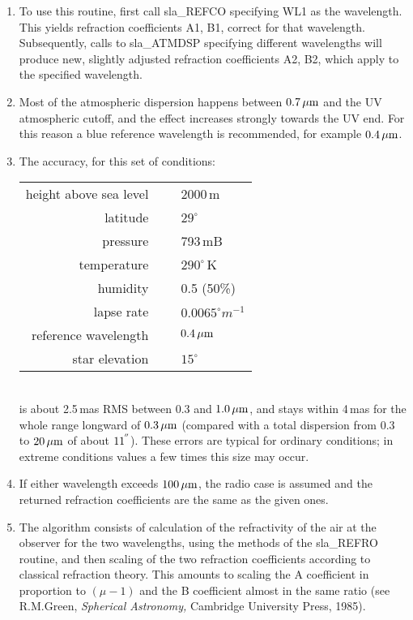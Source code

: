 \documentclass[11pt,twoside]{article}
\newcommand{\arcseci}[1] {$#1\hspace{-0.05em}$\raisebox{-0.5ex}
                         {$^{'\hspace{-0.1em}'}$}}
\renewcommand{\arcseci}[1] {$#1\hspace{-0.05em}^{'\hspace{-0.1em}'}$}
\begin{document}
{
 \begin{enumerate}
  \item To use this routine, first call sla\_REFCO specifying WL1 as the
        wavelength.  This yields refraction coefficients A1, B1, correct
        for that wavelength.  Subsequently, calls to sla\_ATMDSP specifying
        different wavelengths will produce new, slightly adjusted
        refraction coefficients A2, B2, which apply to the specified wavelength.
  \item Most of the atmospheric dispersion happens between $0.7\,\mu{\rm m}$
        and the UV atmospheric cutoff, and the effect increases strongly
        towards the UV end.  For this reason a blue reference wavelength
        is recommended, for example $0.4\,\mu{\rm m}$.
  \item The accuracy, for this set of conditions: \\[1pc]
   \hspace*{5ex} \begin{tabular}{rcl}
        height above sea level & ~ & 2000\,m \\
                      latitude & ~ & $29^\circ$ \\
                      pressure & ~ & 793\,mB \\
                   temperature & ~ & $290^\circ$\,K \\
                      humidity & ~ & 0.5 (50\%) \\
                    lapse rate & ~ & $0.0065^\circ m^{-1}$ \\
          reference wavelength & ~ & $0.4\,\mu{\rm m}$ \\
                star elevation & ~ & $15^\circ$ \\
                  \end{tabular}\\[1pc]
        is about 2.5\,mas RMS between 0.3 and $1.0\,\mu{\rm m}$, and stays
        within 4\,mas for the whole range longward of $0.3\,\mu{\rm m}$
        (compared with a total dispersion from 0.3 to $20\,\mu{\rm m}$
        of about \arcseci{11}).  These errors are typical for ordinary
        conditions;  in extreme conditions values a few times this size
        may occur.
  \item If either wavelength exceeds $100\,\mu{\rm m}$, the radio case
        is assumed and the returned refraction coefficients are the
        same as the given ones.
  \item The algorithm consists of calculation of the refractivity of the
        air at the observer for the two wavelengths, using the methods
        of the sla\_REFRO routine, and then scaling of the two refraction
        coefficients according to classical refraction theory.  This
        amounts to scaling the A coefficient in proportion to $(\mu-1)$ and
        the B coefficient almost in the same ratio (see R.M.Green,
        {\it Spherical Astronomy,}\/ Cambridge University Press, 1985).
 \end{enumerate}
}
\end{document}
